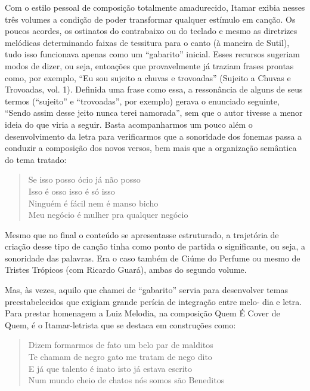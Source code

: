 Com o estilo pessoal de composição totalmente amadurecido, Itamar exibia
nesses três volumes a condição de poder transformar qualquer estímulo em
canção. Os poucos acordes, os ostinatos do contrabaixo ou do teclado e
mesmo as diretrizes melódicas determinando faixas de tessitura para o
canto (à maneira de Sutil), tudo isso funcionava apenas como um
``gabarito'' inicial. Esses recursos sugeriam modos de dizer, ou seja,
entoações que provavelmente já traziam frases prontas como, por exemplo,
``Eu sou sujeito a chuvas e trovoadas'' (Sujeito a Chuvas e Trovoadas,
vol. 1). Definida uma frase como essa, a ressonância de alguns de seus
termos (``sujeito'' e ``trovoadas'', por exemplo) gerava o enunciado
seguinte, ``Sendo assim desse jeito nunca terei namorada'', sem que o
autor tivesse a menor ideia do que viria a seguir. Basta acompanharmos
um pouco além o desenvolvimento da letra para verificarmos que a
sonoridade dos fonemas passa a conduzir a composição dos novos versos,
bem mais que a organização semântica do tema tratado:

\begin{verse}
Se isso posso ócio já não posso\\
Isso é osso isso é só isso\\
Ninguém é fácil nem é manso bicho\\
Meu negócio é mulher pra qualquer negócio
\end{verse}

Mesmo que no final o conteúdo se apresentasse estruturado, a trajetória
de criação desse tipo de canção tinha como ponto de partida o
significante, ou seja, a sonoridade das palavras. Era o caso também de
Ciúme do Perfume ou mesmo de Tristes Trópicos (com Ricardo Guará), ambas
do segundo volume.

Mas, às vezes, aquilo que chamei de ``gabarito'' servia para desenvolver
temas preestabelecidos que exigiam grande perícia de integração entre
melo- dia e letra. Para prestar homenagem a Luiz Melodia, na composição
Quem É Cover de Quem, é o Itamar-letrista que se destaca em construções
como:

\begin{verse}
Dizem formarmos de fato um belo par de malditos\\
Te chamam de negro gato me tratam de nego dito\\
E já que talento é inato isto já estava escrito\\
Num mundo cheio de chatos nós somos são Beneditos
\end{verse}

